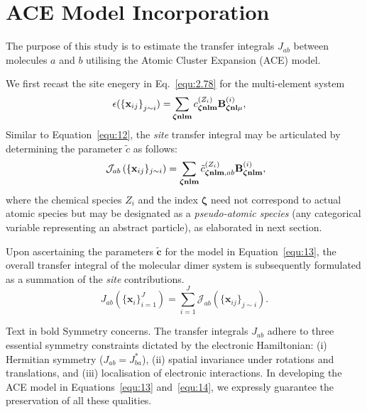 \section{ACE Model Incorporation} \label{sec:4.11}

The purpose of this study is to estimate the transfer integrals \( J_{ab} \) between molecules \(a\) and \(b\) utilising the Atomic Cluster Expansion (ACE) model.

We first recast the site enegery in Eq.~\eqref{equ:2.78} for the multi-element system
\begin{equation}
\label{equ:12}
\begin{split}
    \epsilon(\left\{\mathbf{x}_{ij}\right\}_{j\sim i}) =& 
    \sum_{{\bm\zeta}{\bf nlm}}  
    c^{(Z_i)}_{{\bm\zeta}{\bf nlm}} \textbf{B}_{{\bm \zeta}\mathbf{nl}\mu}^{(i)},
\end{split}
\end{equation}
Similar to Equation~\eqref{equ:12}, the \textit{site} transfer integral may be articulated by determining the parameter \(\tilde{c}\) as follows: 
\begin{equation} \label{equ:13} 
\ \mathcal{J}_{ab}\left(\{\mathbf{x}_{ij}\}_{j \sim i}\right) 
= \sum_{{\bm\zeta}{\bf nlm}} \tilde{c}^{(Z_i)}_{{\bm\zeta}{\bf nlm},ab} \mathbf{B}^{(i)}_{{\bm \zeta}{\bf nlm}}, 
\end{equation} 
where the chemical species \(Z_i\) and the index \({\bm\zeta}\) need not correspond to actual atomic species but may be designated as a \textit{pseudo-atomic species} (any categorical variable representing an abstract particle), as elaborated in next section.

Upon ascertaining the parameters $\tilde{\bm c}$ for the model in Equation~\eqref{equ:13}, the overall transfer integral of the molecular dimer system is subsequently formulated as a summation of the \textit{site} contributions. 
\begin{equation}
\label{equ:14}
J_{ab}\!\left(\{\mathbf{x}_{i}\}_{i=1}^{J}\right) 
= \sum_{i=1}^{J} 
\mathcal{J}_{ab}\!\left(\{\mathbf{x}_{ij}\}_{j \sim i}\right).
\end{equation}


 Text in bold Symmetry concerns.  
 The transfer integrals \(J_{ab}\) adhere to three essential symmetry constraints dictated by the electronic Hamiltonian: (i) Hermitian symmetry (\(J_{ab}=J_{ba}^*\)), (ii) spatial invariance under rotations and translations, and (iii) localisation of electronic interactions.  
 In developing the ACE model in Equations~\eqref{equ:13} and~\eqref{equ:14}, we expressly guarantee the preservation of all these qualities.


